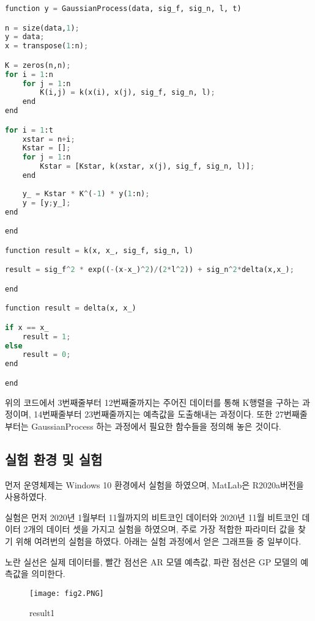 \documentclass[manuscript,screen,review]{acmart}
\begin{document}
\begin{lstlisting}[language=python, caption=GaussianProcess]
function y = GaussianProcess(data, sig_f, sig_n, l, t)

n = size(data,1);
y = data;
x = transpose(1:n);

K = zeros(n,n);
for i = 1:n
    for j = 1:n
        K(i,j) = k(x(i), x(j), sig_f, sig_n, l);
    end
end

for i = 1:t
    xstar = n+i;
    Kstar = [];
    for j = 1:n
        Kstar = [Kstar, k(xstar, x(j), sig_f, sig_n, l)];
    end
        
    y_ = Kstar * K^(-1) * y(1:n);
    y = [y;y_];
end

end

function result = k(x, x_, sig_f, sig_n, l)

result = sig_f^2 * exp((-(x-x_)^2)/(2*l^2)) + sig_n^2*delta(x,x_);

end

function result = delta(x, x_)

if x == x_
    result = 1;
else
    result = 0;
end

end
\end{lstlisting}

위의 코드에서 3번째줄부터 12번째줄까지는 주어진 데이터를 통해 K행렬을 구하는 과정이며, 14번째줄부터 23번째줄까지는 예측값을 도출해내는 과정이다. 또한 27번째줄부터는 GaussianProcess 하는 과정에서 필요한 함수들을 정의해 놓은 것이다.

\subsection{실험 환경 및 실험}

먼저 운영체제는 Windows 10 환경에서 실험을 하였으며, MatLab은 R2020a버전을 사용하였다.

실험은 먼저 2020년 1월부터 11월까지의 비트코인 데이터와 2020년 11월 비트코인 데이터 2개의 데이터 셋을 가지고 실험을 하였으며, 주로 가장 적합한 파라미터 값을 찾기 위해 여려번의 실험을 하였다. 아래는 실험 과정에서 얻은 그래프들 중 일부이다.

노란 실선은 실제 데이터를, 빨간 점선은 AR 모델 예측값, 파란 점선은 GP 모델의 예측값을 의미한다.

\begin{figure}[h] %
\begin{center}
\texttt{[image: fig2.PNG]}
\end{center}
\caption{result1}
\label{fig:long}
\label{fig:onecol}
\end{figure}
\end{document}

